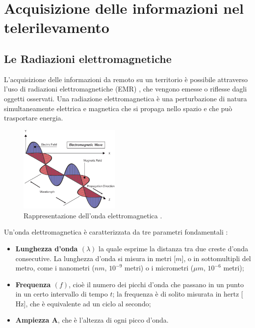 \newpage
\section{Acquisizione delle informazioni nel telerilevamento}
\subsection{Le Radiazioni elettromagnetiche}
L'acquisizione delle informazioni da remoto su un territorio è possibile attraverso 
l'uso di radiazioni elettromagnetiche (EMR) \cite{OndeEletroMagnetiche}, che vengono emesse o riflesse 
dagli oggetti osservati.
Una radiazione elettromagnetica è una perturbazione di natura simultaneamente 
elettrica e magnetica che si propaga nello spazio e che può trasportare energia.  


\begin{figure}[H]
    \centering
    \includegraphics[width=0.44\textwidth]{Immagini/Generiche/OndaElettromagnetica.png}
    \caption{Rappresentazione dell’onda elettromagnetica \cite{Onda_IMG}.}
    \label{fig:onda_elettromagnetica}
\end{figure}

Un’onda elettromagnetica è caratterizzata da tre parametri fondamentali :

\begin{itemize}
    \item \textbf{Lunghezza d’onda $(\lambda)$} la quale esprime la distanza tra due creste d’onda 
    consecutive. La lunghezza d’onda si misura in metri [$m$], o in sottomultipli 
    del metro, come i nanometri ($nm$, $10^{-9}$ metri) o i micrometri ($\mu m$, $10^{-6}$ 
    metri); 

    \item \textbf{Frequenza $(f)$}, cioè il numero dei picchi d’onda che passano in un punto in 
    un certo intervallo di tempo $t$; la frequenza è di solito misurata in hertz [$\text{Hz}$], 
    che è equivalente ad un ciclo al secondo;

    \item \textbf{Ampiezza A}, che è l’altezza di ogni picco d’onda.
\end{itemize}

